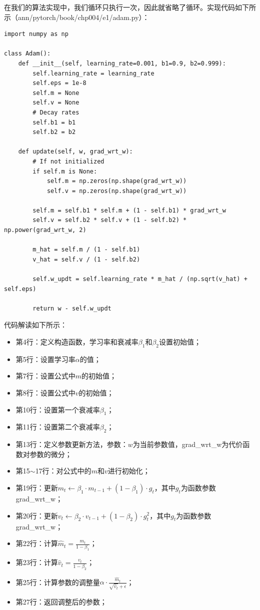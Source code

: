 \documentclass[UTF8]{article}
\begin{document}
在我们的算法实现中，我们循环只执行一次，因此就省略了循环。实现代码如下所示（ann/pytorch/book/chp004/e1/adam.py）：
\begin{lstlisting}
import numpy as np

class Adam():
    def __init__(self, learning_rate=0.001, b1=0.9, b2=0.999):
        self.learning_rate = learning_rate
        self.eps = 1e-8
        self.m = None
        self.v = None
        # Decay rates
        self.b1 = b1
        self.b2 = b2

    def update(self, w, grad_wrt_w):
        # If not initialized
        if self.m is None:
            self.m = np.zeros(np.shape(grad_wrt_w))
            self.v = np.zeros(np.shape(grad_wrt_w))
        
        self.m = self.b1 * self.m + (1 - self.b1) * grad_wrt_w
        self.v = self.b2 * self.v + (1 - self.b2) * np.power(grad_wrt_w, 2)

        m_hat = self.m / (1 - self.b1)
        v_hat = self.v / (1 - self.b2)

        self.w_updt = self.learning_rate * m_hat / (np.sqrt(v_hat) + self.eps)

        return w - self.w_updt
\end{lstlisting}
代码解读如下所示：
\begin{itemize}
\item 第4行：定义构造函数，学习率和衰减率$\beta_{1}$和$\beta_{2}$设置初始值；
\item 第5行：设置学习率$\alpha$的值；
\item 第7行：设置公式中$m$的初始值；
\item 第8行：设置公式中$v$的初始值；
\item 第10行：设置第一个衰减率$\beta_{1}$；
\item 第11行：设置第二个衰减率$\beta_{2}$；
\item 第13行：定义参数更新方法，参数：$w$为当前参数值，grad\_wrt\_w为代价函数对参数的微分；
\item 第15$\sim$17行：对公式中的$m$和$v$进行初始化；
\item 第19行：更新$m_{t} \leftarrow \beta_{1} \cdot m_{t-1} + (1-\beta_{1}) \cdot g_{t}$，其中$g_{t}$为函数参数grad\_wrt\_w；
\item 第20行：更新$v_{t} \leftarrow \beta_{2} \cdot v_{t-1} + (1-\beta_{2}) \cdot g_{t}^{2}$，其中$g_{t}$为函数参数grad\_wrt\_w；
\item 第22行：计算$\hat{m}_{t}=\frac{m_{t}}{1-\beta_{1}}$；
\item 第23行：计算$\hat{v}_{t}=\frac{v_{t}}{1-\beta_{2}}$；
\item 第25行：计算参数的调整量$\alpha \cdot \frac{\hat{m}_{t}}{\sqrt{\hat{v}_{t}} + \epsilon}$；
\item 第27行：返回调整后的参数；
\end{itemize}
\end{document}
